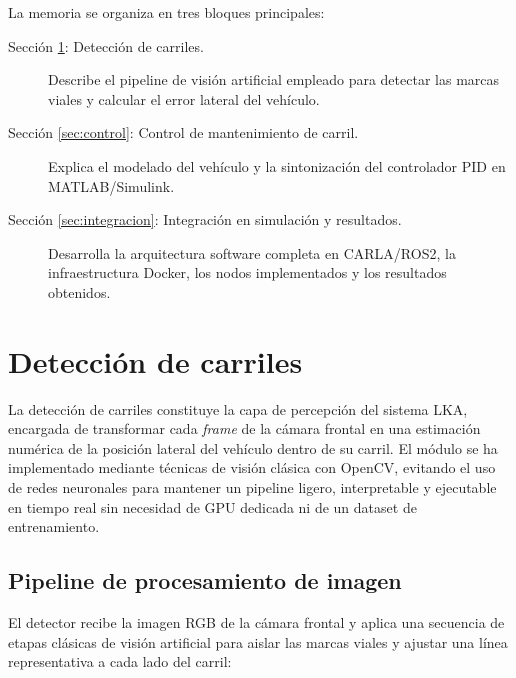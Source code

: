\documentclass[12pt, a4paper]{article}
\begin{document}
La memoria se organiza en tres bloques principales:

\begin{description}
    \item[Sección \ref{sec:carriles}: Detección de carriles.]
          Describe el pipeline de visión artificial empleado para detectar las marcas viales y calcular el error lateral del vehículo.
    \item[Sección \ref{sec:control}: Control de mantenimiento de carril.]
          Explica el modelado del vehículo y la sintonización del controlador PID en MATLAB/Simulink.
    \item[Sección \ref{sec:integracion}: Integración en simulación y resultados.]
          Desarrolla la arquitectura software completa en CARLA/ROS2, la infraestructura Docker, los nodos implementados y los resultados obtenidos.
\end{description}

\section{Detección de carriles}
\label{sec:carriles}

La detección de carriles constituye la capa de percepción del sistema LKA, encargada de transformar cada \textit{frame} de la cámara frontal en una estimación numérica de la posición lateral del vehículo dentro de su carril. El módulo se ha implementado mediante técnicas de visión clásica con OpenCV, evitando el uso de redes neuronales para mantener un pipeline ligero, interpretable y ejecutable en tiempo real sin necesidad de GPU dedicada ni de un dataset de entrenamiento.

\subsection{Pipeline de procesamiento de imagen}

El detector recibe la imagen RGB de la cámara frontal y aplica una secuencia de etapas clásicas de visión artificial para aislar las marcas viales y ajustar una línea representativa a cada lado del carril:
\end{document}
